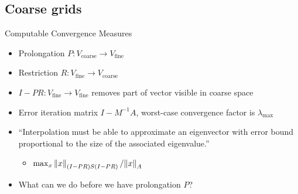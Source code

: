 \documentclass{beamer}
\begin{document}
\subsection{Coarse grids}
\begin{frame}{Computable Convergence Measures}
\newcommand\Vcoarse{V_{\text{coarse}}}
\newcommand\Vfine{V_{\text{fine}}}
  \begin{itemize}
  \item Prolongation $P: \Vcoarse \to \Vfine$
  \item Restriction $R: \Vfine \to \Vcoarse$
  \item $I - PR: \Vfine \to \Vfine$ removes part of vector visible in coarse space
  \item Error iteration matrix $I - M^{-1}A$, worst-case convergence factor is $\lambda_{\max}$
  \item ``Interpolation must be able to approximate an eigenvector with error bound proportional to the size of the associated eigenvalue.''
    \begin{itemize}
    \item $\max_x \left\lVert x \right\rVert_{(I-PR)S(I-PR)}/{\left\lVert x \right\rVert_A}$
    \end{itemize}
  \item What can we do before we have prolongation $P$?
  \end{itemize}
\end{frame}
\end{document}
